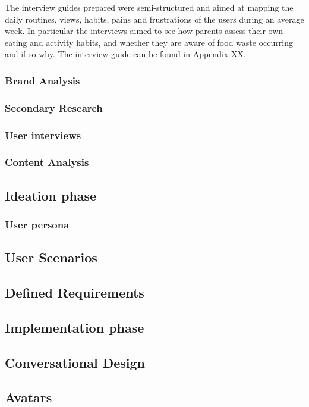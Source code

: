     The interview guides prepared were semi-structured and aimed at mapping the daily routines, views, habits, pains and frustrations of the users during an average week. In particular the interviews aimed to see how parents assess their own eating and activity habits, and whether they are aware of food waste occurring and if so why. The interview guide can be found in Appendix XX.
    
    

    
    \subsubsection{Brand Analysis}
    \subsubsection{Secondary Research}
    \subsubsection{User interviews}
    \subsubsection{Content Analysis}

\subsection{Ideation phase}
    \subsubsection{User persona}
    \subsection{User Scenarios}
    \subsection{Defined Requirements}

\subsection{Implementation phase}
    \subsection{Conversational Design}
    \subsection{Avatars}
    
